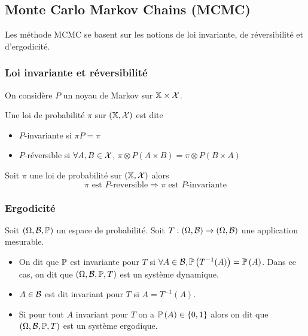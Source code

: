 \documentclass[10pt,a4paper]{article}
\begin{document}
\subsection{Monte Carlo Markov Chains (MCMC)}
Les méthode MCMC se basent sur les notions de loi invariante, de réversibilité et d'ergodicité.
\subsubsection{Loi invariante et réversibilité}
On considère $P$ un noyau de Markov sur $\mathbb{X} \times \mathcal{X}$.
\begin{Def}
  Une loi de probabilité $\pi$ sur $(\mathbb{X}, \mathcal{X})$ est dite
  \begin{itemize}
  \item $P$-invariante si $\pi P = \pi$
  \item $P$-réversible si $\forall A,B \in \mathcal{X}$, $\pi \otimes P (A \times B) = \pi \otimes P (B \times A)$
\end{itemize}
\end{Def}

\begin{Prop}
  Soit $\pi$ une loi de probabilité sur $(\mathbb{X}, \mathcal{X})$ alors 
  $$
  \pi \text{ est } P\text{-reversible} \Rightarrow \pi \text{ est } P\text{-invariante}
  $$
\end{Prop}

\subsubsection{Ergodicité}
\begin{Def}
  Soit $(\Omega, \calB, \PP)$ un espace de probabilité. Soit $T : (\Omega, \mathcal{B}) \to (\Omega, \mathcal{B})$ une application mesurable. 
  \begin{itemize}
  \item On dit que $\PP$ est invariante pour $T$ si $\forall A \in \calB, \PP[T^{-1}(A)] = \PP[A]$. Dans ce cas, on dit que $(\Omega, \calB, \PP, T)$ est un système dynamique.
  \item $A \in \mathcal{B}$ est dit invariant pour $T$ si $A = T^{-1}(A)$.
  \item Si pour tout $A$ invariant pour $T$ on a $\PP[A] \in \ens{0,1}$ alors on dit que $(\Omega, \calB, \PP, T)$ est un système ergodique. 
  \end{itemize}
\end{Def}
\end{document}
